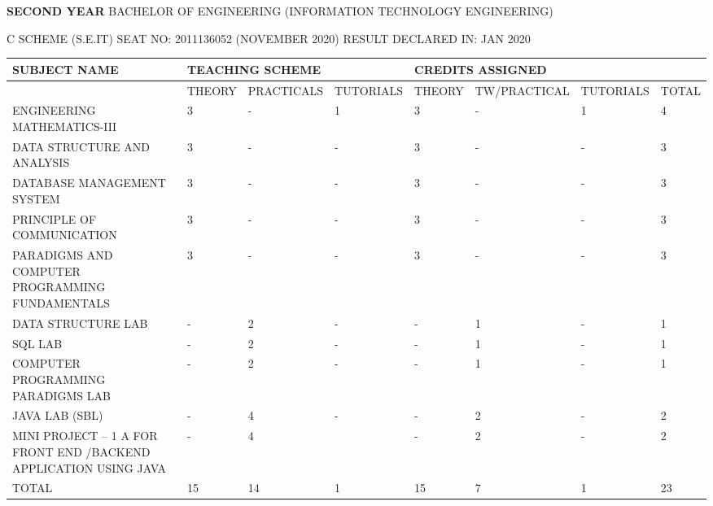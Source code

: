\documentclass{article} %
\begin{document}
\textbf{}

\noindent                 \textbf{SECOND YEAR} BACHELOR OF ENGINEERING (INFORMATION TECHNOLOGY ENGINEERING)

\noindent 

\noindent      \textbf{} C SCHEME (S.E.IT)     SEAT NO: 2011136052 (NOVEMBER 2020)      RESULT DECLARED IN: JAN 2020

\noindent 

\noindent 

\begin{tabular}{|p{1.0in}|p{0.4in}|p{0.6in}|p{0.5in}|p{0.4in}|p{0.5in}|p{0.6in}|p{0.4in}|} \hline 
SUBJECT NAME & \multicolumn{3}{|p{1.5in}|}{TEACHING SCHEME} & \multicolumn{4}{|p{1.9in}|}{CREDITS ASSIGNED} \\ \hline 
 & THEORY & PRACTICALS & TUTORIALS & THEORY & TW/\newline PRACTICAL & TUTORIALS & TOTAL \\ \hline 
ENGINEERING MATHEMATICS-III & 3 & - & 1 & 3 & - & 1 & 4 \\ \hline 
DATA STRUCTURE AND ANALYSIS & 3 & - & - & 3 & - & - & 3 \\ \hline 
DATABASE MANAGEMENT SYSTEM & 3 & - & - & 3 & - & - & 3 \\ \hline 
PRINCIPLE OF COMMUNICATION & 3 & - & - & 3 & - & - & 3 \\ \hline 
PARADIGMS AND COMPUTER PROGRAMMING FUNDAMENTALS & 3 & - & - & 3 & - & - & 3 \\ \hline 
DATA STRUCTURE LAB & - & 2 & - & - & 1 & - & 1 \\ \hline 
SQL LAB & - & 2 & - & - & 1 & - & 1 \\ \hline 
COMPUTER PROGRAMMING PARADIGMS LAB & - & 2 & - & - & 1 & - & 1 \\ \hline 
JAVA LAB (SBL) & - & 4 & - & - & 2 & - & 2 \\ \hline 
MINI PROJECT -- 1 A FOR FRONT END /BACKEND APPLICATION USING JAVA & - & 4 &  & - & 2 & - & 2 \\ \hline 
TOTAL & 15 & 14 & 1 & 15 & 7 & 1 & 23 \\ \hline 
\end{tabular}



\noindent 

\noindent 

\noindent 

\noindent 

\noindent 

\noindent 
\end{document}
